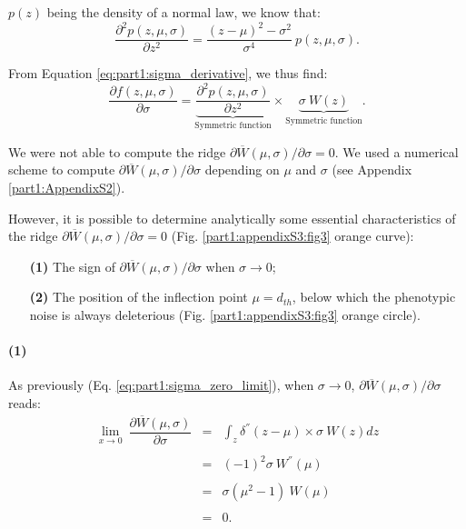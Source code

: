 $p(z)$ being the density of a normal law, we know that:
\begin{equation}
\dfrac{\partial^2 p(z,\mu,\sigma)}{\partial z^2} = \dfrac{(z-\mu)^2-\sigma^2}{\sigma^4}\ p(z,\mu,\sigma).
\end{equation}

From Equation \ref{eq:part1:sigma_derivative}, we thus find:
\begin{equation}
\dfrac{\partial f(z,\mu,\sigma)}{\partial \sigma} = \underbrace{\dfrac{\partial^2 p(z,\mu,\sigma)}{\partial z^2}}_{\text{Symmetric function}} \times \underbrace{\sigma\ W(z)}_{\text{Symmetric function}}.
\end{equation}

We were not able to compute the ridge $\partial \overline{W}(\mu,\sigma)/\partial \sigma=0$. We used a numerical scheme to compute $\partial \overline{W}(\mu,\sigma)/\partial \sigma$ depending on $\mu$ and $\sigma$ (see Appendix \ref{part1:AppendixS2}).

However, it is possible to determine analytically some essential characteristics of the ridge $\partial \overline{W}(\mu,\sigma)/\partial \sigma=0$ (Fig. \ref{part1:appendixS3:fig3} orange curve):
\begin{enumerate}
\item[\textbf{(1)}] The sign of $\partial \overline{W}(\mu,\sigma)/\partial \sigma$ when $\sigma \rightarrow 0$;
\item[\textbf{(2)}] The position of the inflection point $\mu=d_{th}$, below which the phenotypic noise is always deleterious (Fig. \ref{part1:appendixS3:fig3} orange circle).
\end{enumerate}

\paragraph{(1)}
As previously (Eq. \ref{eq:part1:sigma_zero_limit}), when $\sigma \rightarrow 0$, $\partial \overline{W}(\mu,\sigma)/\partial \sigma$ reads:
\begin{equation}
\begin{array}{rcl}
\lim\limits_{x \to 0}\ \dfrac{\partial \overline{W}(\mu,\sigma)}{\partial \sigma} & = & \displaystyle\int_z \delta^{''}(z-\mu) \times \sigma\ W(z) dz\\\\
& = & (-1)^2 \sigma\ W^{''}(\mu)\\\\
& = & \sigma (\mu^2-1) \ W(\mu)\\\\
& = & 0.
\end{array}
\end{equation}

